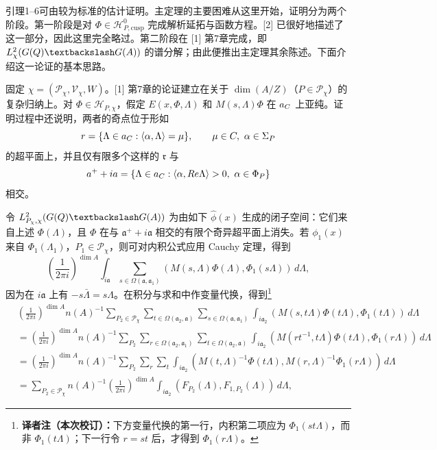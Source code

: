引理1--6可由较为标准的估计证明。主定理的主要困难从这里开始，证明分为两个阶段。第一阶段是对 $\Phi\in\mathcal H_{P,\mathrm{cusp}}^0$ 完成解析延拓与函数方程。[2] 已很好地描述了这一部分，因此这里完全略过。第二阶段在 [1] 第7章完成，即 $L_\chi^2(G(\Q)\backslash G(A))$ 的谱分解；由此便推出主定理其余陈述。下面介绍这一论证的基本思路。

固定 $\chi=(\mathcal P_\chi,\mathcal V_\chi,W)$。[1] 第7章的论证建立在关于 $\dim(A/Z)$（$P\in\mathcal P_\chi$）的复杂归纳上。对 $\Phi\in\mathcal H_{P,\chi}$，假定 $E(x,\Phi,\Lambda)$ 和 $M(s,\Lambda)\Phi$ 在 $a_C$ 上亚纯。证明过程中还说明，两者的奇点位于形如
\[
 r=\{\Lambda\in a_C:\langle\alpha,\Lambda\rangle=\mu\},
 \qquad\mu\in C,\ \alpha\in\Sigma_P
\]
的超平面上，并且仅有限多个这样的 $\mathfrak r$ 与
\[
 a^++ia
 =\{\Lambda\in a_C:\langle\alpha,Re\Lambda\rangle>0,
 \ \alpha\in\Phi_P\}
\]
相交。

令 $L_{\mathcal P_\chi,\chi}^2(G(\Q)\backslash G(A))$ 为由如下 $\widehat\phi(x)$ 生成的闭子空间：它们来自上述 $\Phi(\Lambda)$，且 $\Phi$ 在与 $\mathfrak a^++i\mathfrak a$ 相交的有限个奇异超平面上消失。若 $\phi_1(x)$ 来自 $\Phi_1(\Lambda_1)$，$P_1\in\mathcal P_\chi$，则可对内积公式应用 Cauchy 定理，得到
\[
 \left(\frac1{2\pi i}\right)^{\dim A}\int_{i\mathfrak a}
 \sum_{s\in\Omega(\mathfrak a,\mathfrak a_1)}
 (M(s,\Lambda)\Phi(\Lambda),\Phi_1(s\Lambda))\,d\Lambda,
\]
因为在 $i\mathfrak a$ 上有 $-s\bar\Lambda=s\Lambda$。在积分与求和中作变量代换，得到\footnote{\textbf{译者注（本次校订）：}下方变量代换的第一行，内积第二项应为 $\Phi_1(st\Lambda)$，而非 $\Phi_1(t\Lambda)$；下一行令 $r=st$ 后，才得到 $\Phi_1(r\Lambda)$。}
\[
\begin{aligned}
 &\left(\frac1{2\pi i}\right)^{\dim A}n(A)^{-1}
 \sum_{P_2\in\mathcal P_\chi}\sum_{t\in\Omega(\mathfrak a_2,\mathfrak a)}
 \sum_{s\in\Omega(\mathfrak a,\mathfrak a_1)}
 \int_{i\mathfrak a_2}(M(s,t\Lambda)\Phi(t\Lambda),\Phi_1(t\Lambda))\,d\Lambda\\
 &=\left(\frac1{2\pi i}\right)^{\dim A}n(A)^{-1}
 \sum_{P_2}\sum_{r\in\Omega(\mathfrak a_2,\mathfrak a_1)}
 \sum_{t\in\Omega(\mathfrak a_2,\mathfrak a)}
 \int_{i\mathfrak a_2}(M(rt^{-1},t\Lambda)\Phi(t\Lambda),\Phi_1(r\Lambda))\,d\Lambda\\
 &=\left(\frac1{2\pi i}\right)^{\dim A}n(A)^{-1}\sum_{P_2}\sum_r\sum_t
 \int_{i\mathfrak a_2}(M(t,\Lambda)^{-1}\Phi(t\Lambda),
 M(r,\Lambda)^{-1}\Phi_1(r\Lambda))\,d\Lambda\\
 &=\sum_{P_2\in\mathcal P_\chi}n(A)^{-1}
 \left(\frac1{2\pi i}\right)^{\dim A}\int_{i\mathfrak a_2}
 (F_{P_2}(\Lambda),F_{1,P_2}(\Lambda))\,d\Lambda,
\end{aligned}
\]

